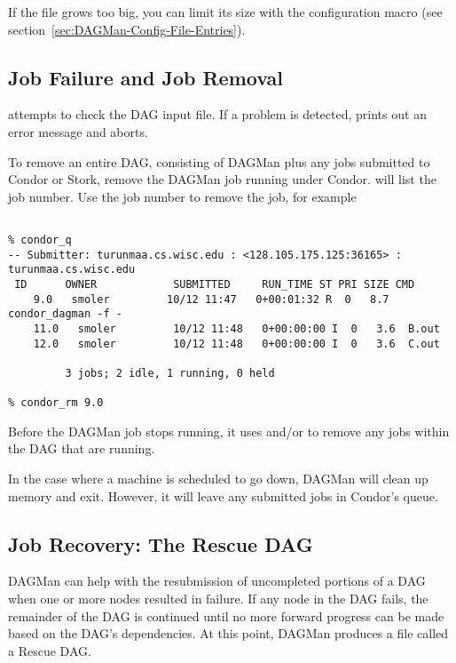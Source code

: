 If the  file grows too big, you can limit its size
with the  configuration macro (see
section~\ref{sec:DAGMan-Config-File-Entries}).

\subsection{Job Failure and Job Removal}

 attempts to check the DAG input file.
If a problem is detected,
 prints out an error message and aborts.

To remove an entire DAG, consisting of DAGMan plus
any jobs submitted to Condor or Stork,
remove the DAGMan job running under Condor.
 will list the job number.
Use the job number to remove the job, for example

\footnotesize
\begin{verbatim}

% condor_q
-- Submitter: turunmaa.cs.wisc.edu : <128.105.175.125:36165> : turunmaa.cs.wisc.edu
 ID      OWNER            SUBMITTED     RUN_TIME ST PRI SIZE CMD
    9.0   smoler         10/12 11:47   0+00:01:32 R  0   8.7  condor_dagman -f -
    11.0   smoler         10/12 11:48   0+00:00:00 I  0   3.6  B.out
    12.0   smoler         10/12 11:48   0+00:00:00 I  0   3.6  C.out

         3 jobs; 2 idle, 1 running, 0 held

% condor_rm 9.0
\end{verbatim}
\normalsize

Before the DAGMan job stops running, it uses  and/or
to remove any jobs within the DAG that are running.

In the case where a
machine is scheduled to go down,
DAGMan will clean up memory and exit.
However, it will leave any submitted jobs
in Condor's queue.

\subsection{Job Recovery:  The Rescue DAG}

DAGMan can help with the resubmission of uncompleted
portions of a DAG when one or more nodes resulted in failure.
If any node in the DAG fails,
the remainder of the DAG is continued until no more forward
progress can be made based on the DAG's dependencies.
At this point, DAGMan produces a file
called a Rescue DAG.

